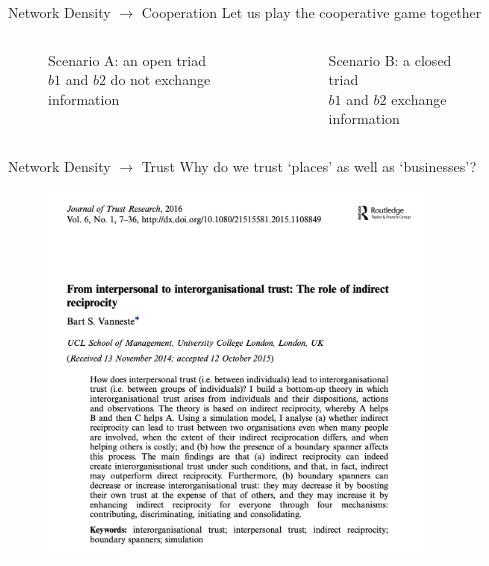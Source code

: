 \documentclass[notes, aspectratio=1610]{beamer}
\begin{document}
\begin{frame}
	{Network Density $\rightarrow$ Cooperation}
	{Let us play the cooperative game together}
	\begin{columns}
	\begin{column}{0.5\textwidth}
		\begin{figure}
				\begin{center}
					
				\end{center}
				\caption*{Scenario A: an open triad\\$b1$ and $b2$ do not exchange information}
		\end{figure}
	\end{column}
	\begin{column}{0.5\textwidth}
		\begin{figure}
			\begin{center}
				
			\end{center}
			\caption*{Scenario B: a closed triad\\$b1$ and $b2$ exchange information}
	\end{figure}
	\end{column}
	\end{columns}
\end{frame}

\begin{frame}
	{Network Density $\rightarrow$ Trust}
	{Why do we trust `places' as well as `businesses'?}
        \begin{figure}
        	\begin{center}
        		\includegraphics[width=0.9\textwidth]{images/trust_research.png}
        	\end{center}
        \end{figure}
\end{frame}
\end{document}
